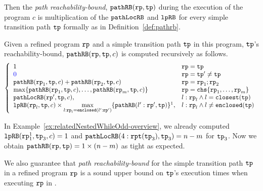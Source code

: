 Then the \emph{path reachability-bound}, $\mathtt{pathRB}(\mathtt{rp}, \mathtt{tp})$ during the execution of the program $c$ is multiplication of the $\mathtt{pathLocRB}$ and $\mathtt{lpRB}$ for every simple transition path $\mathtt{tp}$ formally as in Definition~\ref{def:pathrb}.
%
\begin{defn}
  \label{def:pathrb}
  Given a refined program $\mathtt{rp}$ and a simple transition path $\mathtt{tp}$ in this program, 
  $\mathtt{tp}$'s reachability-bound, $\mathtt{pathRB}(\mathtt{rp}, \mathtt{tp}, c)$
  is computed recursively as follows. 
{\small 
\[
  \left\{ 
  \begin{array}{ll}
    1  & \rprog = \tpath\\
    \highlight{0} & \rprog = \tpath' \neq \tpath\\
    \inoutB(\rprog_1, \tpath, c) + \inoutB(\rprog_2, \tpath, c) & \rprog = \rprog_1;\rprog_2 \\
    \max\left\{ \inoutB(\rprog_1, \tpath, c), \ldots, \inoutB(\rprog_m, \tpath, c) \right\} 
    & \rprog = \rpchoose{\rprog_1, \ldots, \rprog_m } \\
    \outinB(\rprog', \tpath, c), & l: \rprog_l \land l = \kw{closest}(\tpath) \\
    \lpchB(\rprog_l, \tpath , c)
    \times \max\limits_{l:\rprog_l = \kw{enclosed}(l':\rprog')}
   \{\inoutB(l':\rprog', \tpath)\} \footnotemark, & l: \rprog_l \land l \neq \kw{enclosed}(\tpath) \\
  \end{array}
  \right.
  \]
 }
 \end{defn}
In Example~\ref{ex:relatedNestedWhileOdd-overview}, we already computed $\mathtt{lpRB}(\mathtt{rp}_1^1, \mathtt{tp}_3, c) = 1$ and
$\mathtt{pathLocRB}(4: \mathtt{rpt}(\mathtt{tp}_3), \mathtt{tp}_3) = n - m$ for $\mathtt{tp}_3$. Now we obtain $\mathtt{pathRB}(\mathtt{rp}, \mathtt{tp}) = 1 \times (n - m)$ as tight as expected.

We also guarantee that \emph{path reachability-bound} for the simple transition path $\mathtt{tp}$ in a refined program $\mathtt{rp}$ is a sound upper bound on $\mathtt{tp}$'s execution times when executing $\mathtt{rp}$
in .